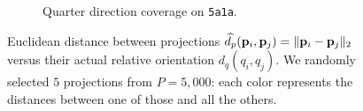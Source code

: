 \begin{figure}
\begin{minipage}[t]{0.99\linewidth}
\begin{subfigure}[t]{0.33\textwidth}
            \caption{Quarter direction coverage on \texttt{5a1a}.}%
            \label{fig:euclidean-not-robust:5a1a-quarter}
        \end{subfigure}
        \caption{%
            Euclidean distance between projections $\widehat{d_p}(\mathbf{p}_i, \mathbf{p}_j) = \| \mathbf{p}_i - \mathbf{p}_j \|_2$ versus their actual relative orientation $d_q(q_i, q_j)$.
            We randomly selected $5$ projections from $P = 5,000$: each color represents the distances between one of those and all the others.
        }\label{fig:euclidean-not-robust}
    \end{minipage}
\end{figure}



